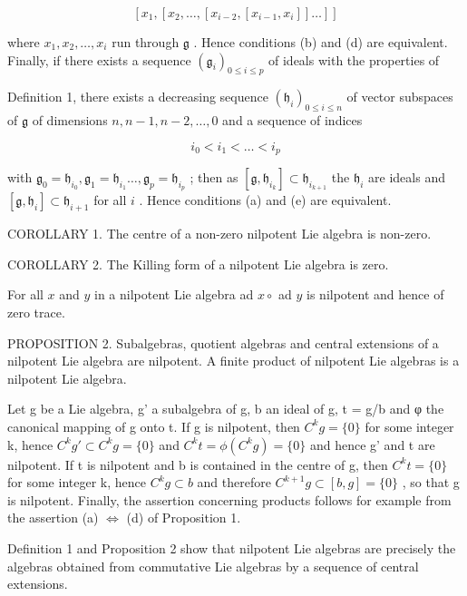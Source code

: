 \[
\left[ x _ {1}, \left[ x _ {2}, \dots , \left[ x _ {i - 2}, \left[ x _ {i - 1}, x _ {i} \right] \right] \dots \right] \right]
\]

where \(x_{1}, x_{2}, \ldots, x_{i}\) run through \(\mathfrak{g}\) . Hence conditions (b) and (d) are equivalent. Finally, if there exists a sequence \((\mathfrak{g}_i)_{0 \leqslant i \leqslant p}\) of ideals with the properties of

Definition 1, there exists a decreasing sequence \((\mathfrak{h}_i)_{0\leqslant i\leqslant n}\) of vector subspaces of \(\mathfrak{g}\) of dimensions \(n,n - 1,n - 2,\ldots ,0\) and a sequence of indices

\[
i _ {0} <   i _ {1} <   \dots <   i _ {p}
\]

with \(\mathfrak{g}_0 = \mathfrak{h}_{i_0},\mathfrak{g}_1 = \mathfrak{h}_{i_1}\dots ,\mathfrak{g}_p = \mathfrak{h}_{i_p}\) ; then as \([\mathfrak{g},\mathfrak{h}_{i_k}]\subset \mathfrak{h}_{i_{k + 1}}\) the \(\mathfrak{h}_i\) are ideals and \([\mathfrak{g},\mathfrak{h}_i]\subset \mathfrak{h}_{i + 1}\) for all \(i\) . Hence conditions (a) and (e) are equivalent.

COROLLARY 1. The centre of a non-zero nilpotent Lie algebra is non-zero.

COROLLARY 2. The Killing form of a nilpotent Lie algebra is zero.

For all \(x\) and \(y\) in a nilpotent Lie algebra ad \(x \circ\) ad \(y\) is nilpotent and hence of zero trace.

PROPOSITION 2. Subalgebras, quotient algebras and central extensions of a nilpotent Lie algebra are nilpotent. A finite product of nilpotent Lie algebras is a nilpotent Lie algebra.

Let g be a Lie algebra, g' a subalgebra of g, b an ideal of g, t = g/b and φ the canonical mapping of g onto t. If g is nilpotent, then \(C^{k}g = \{0\}\) for some integer k, hence \(C^{k}g' \subset C^{k}g = \{0\}\) and \(C^{k}t = \phi(C^{k}g) = \{0\}\) and hence g' and t are nilpotent. If t is nilpotent and b is contained in the centre of g, then \(C^{k}t = \{0\}\) for some integer k, hence \(C^{k}g \subset b\) and therefore \(C^{k+1}g \subset [b, g] = \{0\}\) , so that g is nilpotent. Finally, the assertion concerning products follows for example from the assertion (a) \(\Leftrightarrow\) (d) of Proposition 1.

Definition 1 and Proposition 2 show that nilpotent Lie algebras are precisely the algebras obtained from commutative Lie algebras by a sequence of central extensions.

